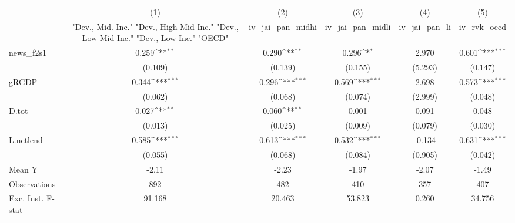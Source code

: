 {
\def\sym#1{\ifmmode^{#1}\else\(^{#1}\)\fi}
\begin{tabular}{l*{5}{c}}
\toprule
            &\multicolumn{1}{c}{(1)}&\multicolumn{1}{c}{(2)}&\multicolumn{1}{c}{(3)}&\multicolumn{1}{c}{(4)}&\multicolumn{1}{c}{(5)}\\
            &\multicolumn{1}{c}{ "Dev., Mid.-Inc." "Dev., High Mid-Inc." "Dev., Low Mid-Inc." "Dev., Low-Inc." "OECD" }&\multicolumn{1}{c}{iv\_jai\_pan\_midhi}&\multicolumn{1}{c}{iv\_jai\_pan\_midli}&\multicolumn{1}{c}{iv\_jai\_pan\_li}&\multicolumn{1}{c}{iv\_rvk\_oecd}\\
\midrule
news\_f2s1   &       0.259\sym{**} &       0.290\sym{**} &       0.296\sym{*}  &       2.970         &       0.601\sym{***}\\
            &     (0.109)         &     (0.139)         &     (0.155)         &     (5.293)         &     (0.147)         \\
\addlinespace
gRGDP       &       0.344\sym{***}&       0.296\sym{***}&       0.569\sym{***}&       2.698         &       0.573\sym{***}\\
            &     (0.062)         &     (0.068)         &     (0.074)         &     (2.999)         &     (0.048)         \\
\addlinespace
D.tot       &       0.027\sym{**} &       0.060\sym{**} &       0.001         &       0.091         &       0.048         \\
            &     (0.013)         &     (0.025)         &     (0.009)         &     (0.079)         &     (0.030)         \\
\addlinespace
L.netlend   &       0.585\sym{***}&       0.613\sym{***}&       0.532\sym{***}&      -0.134         &       0.631\sym{***}\\
            &     (0.055)         &     (0.068)         &     (0.084)         &     (0.905)         &     (0.042)         \\
\midrule
Mean Y      &       -2.11         &       -2.23         &       -1.97         &       -2.07         &       -1.49         \\
Observations&         892         &         482         &         410         &         357         &         407         \\
Exc. Inst. F-stat&      91.168         &      20.463         &      53.823         &       0.260         &      34.756         \\
\bottomrule
\end{tabular}
}
